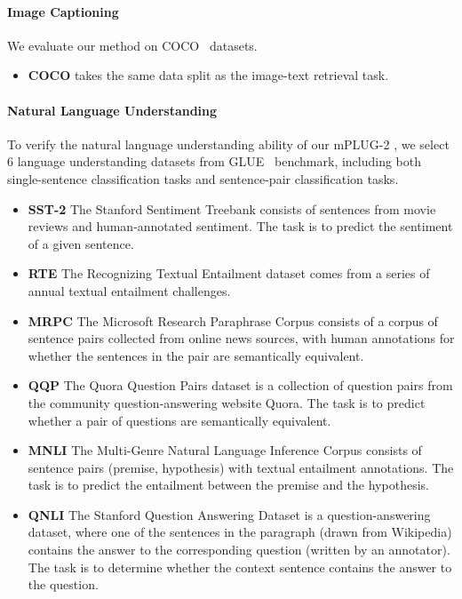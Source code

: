\documentclass{article}
\theoremstyle{plain}
\theoremstyle{definition}
\theoremstyle{remark}
\newcommand{\modelname}{mPLUG-2 }
\begin{document}
\paragraph{Image Captioning}
We evaluate our method on COCO~\citep{lin2014microsoft} datasets.
\begin{itemize}
    \item \textbf{COCO} takes the same data split as the image-text retrieval task. 


\end{itemize}

\paragraph{Natural Language Understanding}
To verify the natural language understanding ability of our \modelname, we select 6 language understanding datasets from GLUE~\citep{Wang2018GLUEAM} benchmark, including both single-sentence classification tasks and sentence-pair classification tasks.

\begin{itemize}
    \item \textbf{SST-2} The Stanford Sentiment Treebank consists of sentences from movie reviews and human-annotated sentiment. The task is to predict the sentiment of a given sentence. 
    \item \textbf{RTE} The Recognizing Textual Entailment dataset comes from a series of annual textual entailment challenges. 
    \item \textbf{MRPC} The Microsoft Research Paraphrase Corpus consists of a corpus of sentence pairs collected from online news sources, with human annotations for whether the sentences in the pair are semantically equivalent.
    \item \textbf{QQP} The Quora Question Pairs dataset is a collection of question pairs from the community question-answering website Quora. The task is to predict whether a pair of questions are semantically equivalent.
    \item \textbf{MNLI} The Multi-Genre Natural Language Inference Corpus consists of sentence pairs (premise, hypothesis) with textual entailment annotations. The task is to predict the entailment between the premise and the hypothesis.
    \item \textbf{QNLI} The Stanford Question Answering Dataset is a question-answering dataset, where one of the sentences in the paragraph (drawn from Wikipedia) contains the answer to the corresponding question (written by an annotator). The task is to determine whether the context sentence contains the answer to the question.

\end{itemize}
\end{document}
